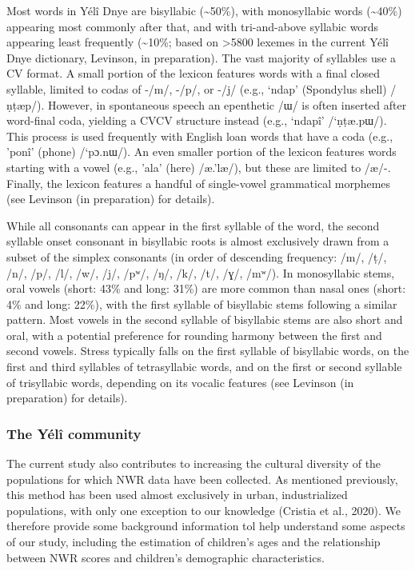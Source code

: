 \documentclass[english,,man,floatsintext]{apa6}
\begin{document}
Most words in Yélî Dnye are bisyllabic (\textasciitilde{}50\%), with
monosyllabic words (\textasciitilde{}40\%) appearing most commonly after
that, and with tri-and-above syllabic words appearing least frequently
(\textasciitilde{}10\%; based on \textgreater{}5800 lexemes in the
current Yélî Dnye dictionary, Levinson, in preparation). The vast
majority of syllables use a CV format. A small portion of the lexicon
features words with a final closed syllable, limited to codas of -/m/,
-/p/, or -/j/ (e.g., `ndap' (Spondylus shell) /ṇṭæp/). However, in
spontaneous speech an epenthetic /ɯ/ is often inserted after word-final
coda, yielding a CVCV structure instead (e.g., `ndapî' /`ṇṭæ.pɯ/). This
process is used frequently with English loan words that have a coda
(e.g., 'ponî' (phone) /`pɔ.nɯ/). An even smaller portion of the lexicon
features words starting with a vowel (e.g., 'ala' (here) /æ.'læ/), but
these are limited to /æ/-. Finally, the lexicon features a handful of
single-vowel grammatical morphemes (see Levinson (in preparation) for
details).

While all consonants can appear in the first syllable of the word, the
second syllable onset consonant in bisyllabic roots is almost
exclusively drawn from a subset of the simplex consonants (in order of
descending frequency: /m/, /ṭ/, /n/, /p/, /l/, /w/, /j/, /pʷ/, /ŋ/, /k/,
/t/, /ɣ/, /mʷ/). In monosyllabic stems, oral vowels (short: 43\% and
long: 31\%) are more common than nasal ones (short: 4\% and long: 22\%),
with the first syllable of bisyllabic stems following a similar pattern.
Most vowels in the second syllable of bisyllabic stems are also short
and oral, with a potential preference for rounding harmony between the
first and second vowels. Stress typically falls on the first syllable of
bisyllabic words, on the first and third syllables of tetrasyllabic
words, and on the first or second syllable of trisyllabic words,
depending on its vocalic features (see Levinson (in preparation) for
details).

\subsubsection{The Yélî community}\label{the-yuxe9luxee-community}

The current study also contributes to increasing the cultural diversity
of the populations for which NWR data have been collected. As mentioned
previously, this method has been used almost exclusively in urban,
industrialized populations, with only one exception to our knowledge
(Cristia et al., 2020). We therefore provide some background information
tol help understand some aspects of our study, including the estimation
of children's ages and the relationship between NWR scores and
children's demographic characteristics.
\end{document}
